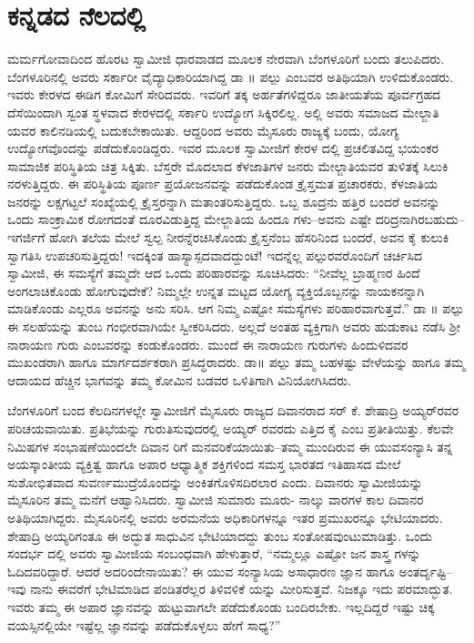 
\chapter{ಕನ್ನಡದ ನೆಲದಲ್ಲಿ}

\noindent

ಮರ್ಮಗೋವಾದಿಂದ ಹೊರಟ ಸ್ವಾಮೀಜಿ ಧಾರವಾಡದ ಮೂಲಕ ನೇರವಾಗಿ ಬೆಂಗಳೂರಿಗೆ ಬಂದು ತಲುಪಿದರು. ಬೆಂಗಳೂರಿನಲ್ಲಿ ಅವರು ಸರ್ಕಾರೀ ವೈದ್ಯಾಧಿಕಾರಿಯಾಗಿದ್ದ ಡಾ ॥ ಪಲ್ಪು ಎಂಬವರ ಅತಿಥಿಯಾಗಿ ಉಳಿದುಕೊಂಡರು. ಇವರು ಕೇರಳದ ಈಡಿಗ ಕೋಮಿಗೆ ಸೇರಿದವರು. ಇವರಿಗೆ ತಕ್ಕ ಅರ್ಹತೆಗಳಿದ್ದರೂ ಜಾತೀಯತೆಯ ಪೂರ್ವಗ್ರಹದ ದೆಸೆಯಿಂದಾಗಿ ಸ್ವಂತ ಸ್ಥಳವಾದ ಕೇರಳದಲ್ಲಿ ಸರ್ಕಾರಿ ಉದ್ಯೋಗ ಸಿಕ್ಕಿರಲಿಲ್ಲ. ಅಲ್ಲಿ ಅವರು ಸಮಾಜದ ಮೇಲ್ಜಾತಿ ಯವರ ಕಾಲಿನಡಿಯಲ್ಲಿ ಬದುಕಬೇಕಾಯಿತು. ಆದ್ದರಿಂದ ಅವರು ಮೈಸೂರು ರಾಜ್ಯಕ್ಕೆ ಬಂದು, ಯೋಗ್ಯ ಉದ್ಯೋಗವೊಂದನ್ನು ಪಡೆದುಕೊಂಡಿದ್ದರು. ಇವರ ಮೂಲಕ ಸ್ವಾಮೀಜಿಗೆ ಕೇರಳ ದಲ್ಲಿ ಪ್ರಚಲಿತವಿದ್ದ ಭಯಂಕರ ಸಾಮಾಜಿಕ ಪರಿಸ್ಥಿತಿಯ ಚಿತ್ರ ಸಿಕ್ಕಿತು. ಬೆಸ್ತರೇ ಮೊದಲಾದ ಕೆಳಜಾತಿಗಳ ಜನರು ಮೇಲ್ಜಾತಿಯವರ ತುಳಿತಕ್ಕೆ ಸಿಲುಕಿ ನರಳುತ್ತಿದ್ದರು. ಈ ಪರಿಸ್ಥಿತಿಯ ಪೂರ್ಣ ಪ್ರಯೋಜನವನ್ನು ಪಡೆದುಕೊಂಡ ಕ್ರೈಸ್ತಮತ ಪ್ರಚಾರಕರು, ಕೆಳಜಾತಿಯ ಜನರನ್ನು ಲಕ್ಷಗಟ್ಟಲೆ ಸಂಖ್ಯೆಯಲ್ಲಿ ಕ್ರೈಸ್ತರನ್ನಾಗಿ ಮತಾಂತರಿಸುತ್ತಿದ್ದರು. ಒಬ್ಬ ಶೂದ್ರನು ಹತ್ತಿರ ಬಂದರೆ ಅವನನ್ನು ಒಂದು ಸಾಂಕ್ರಾಮಿಕ ರೋಗದಂತೆ ದೂರವಿಡುತ್ತಿದ್ದ ಮೇಲ್ಜಾತಿಯ ಹಿಂದೂ ಗಳು–ಅವನು ಎಷ್ಟೇ ದರಿದ್ರನಾಗಿರಬಹುದು–ಇಗರ್ಜಿಗೆ ಹೋಗಿ ತಲೆಯ ಮೇಲೆ ಸ್ವಲ್ಪ ನೀರನ್ನೆರಚಿಸಿಕೊಂಡು ಕ್ರೈಸ್ತನೆಂಬ ಹೆಸರಿನಿಂದ ಬಂದರೆ, ಅವನ ಕೈ ಕುಲುಕಿ ಸ್ವಾಗತಿಸಿ ಉಪಚರಿಸುತ್ತಿದ್ದರು! ಇದಕ್ಕಿಂತ ಹಾಸ್ಯಾಸ್ಪದವಾದದ್ದುಂಟೆ! ಇದನ್ನೆಲ್ಲ ಪಲ್ಪುರವರೊಂದಿಗೆ ಚರ್ಚಿಸಿದ ಸ್ವಾಮೀಜಿ, ಈ ಸಮಸ್ಯೆಗೆ ತಮ್ಮದೇ ಆದ ಒಂದು ಪರಿಹಾರವನ್ನು ಸೂಚಿಸಿದರು: “ನೀವೆಲ್ಲ ಬ್ರಾಹ್ಮಣರ ಹಿಂದೆ ಅಂಗಲಾಚಿಕೊಂಡು ಹೋಗುವುದೇಕೆ? ನಿಮ್ಮಲ್ಲೇ ಉನ್ನತ ಮಟ್ಟದ ಯೋಗ್ಯ ವ್ಯಕ್ತಿಯೊಬ್ಬನನ್ನು ನಾಯಕನನ್ನಾಗಿ ಮಾಡಿಕೊಂಡು ಎಲ್ಲರೂ ಅವನನ್ನು ಅನು ಸರಿಸಿ. ಆಗ ನಿಮ್ಮ ಎಷ್ಟೋ ಸಮಸ್ಯೆಗಳು ಪರಿಹಾರವಾಗುತ್ತವೆ.” ಡಾ ॥ ಪಲ್ಪು ಈ ಸಲಹೆಯನ್ನು ತುಂಬ ಗಂಭೀರವಾಗಿಯೇ ಸ್ವೀಕರಿಸಿದರು. ಅಲ್ಲದೆ ಅಂತಹ ವ್ಯಕ್ತಿಗಾಗಿ ಅವರು ಹುಡುಕಾಟ ನಡೆಸಿ ಶ್ರೀ ನಾರಾಯಣ ಗುರು ಎಂಬವರನ್ನು ಕಂಡುಕೊಂಡರು. ಮುಂದೆ ಈ ನಾರಾಯಣ ಗುರುಗಳು ಹಿಂದುಳಿದವರ ಮುಖಂಡರಾಗಿ ಹಾಗೂ ಮಾರ್ಗದರ್ಶಕರಾಗಿ ಪ್ರಸಿದ್ಧರಾದರು. ಡಾ॥ ಪಲ್ಪು ತಮ್ಮ ಬಹಳಷ್ಟು ವೇಳೆಯನ್ನು ಹಾಗೂ ತಮ್ಮ ಆದಾಯದ ಹೆಚ್ಚಿನ ಭಾಗವನ್ನು ತಮ್ಮ ಕೋಮಿನ ಬಡವರ ಒಳಿತಿಗಾಗಿ ವಿನಿಯೋಗಿಸಿದರು.

ಬೆಂಗಳೂರಿಗೆ ಬಂದ ಕೆಲದಿನಗಳಲ್ಲೇ ಸ್ವಾಮೀಜಿಗೆ ಮೈಸೂರು ರಾಜ್ಯದ ದಿವಾನರಾದ ಸರ್ ಕೆ. ಶೇಷಾದ್ರಿ ಅಯ್ಯರ್​ರವರ ಪರಿಚಯವಾಯಿತು. ಪ್ರತಿಭೆಯನ್ನು ಗುರುತಿಸುವುದರಲ್ಲಿ ಅಯ್ಯರ್ ರವರದು ಎತ್ತಿದ ಕೈ ಎಂಬ ಪ್ರತೀತಿಯಿತ್ತು. ಕೆಲವೇ ನಿಮಿಷಗಳ ಸಂಭಾಷಣೆಯಿಂದಲೇ ದಿವಾನ ರಿಗೆ ಮನವರಿಕೆಯಾಯಿತು–ತಮ್ಮ ಮುಂದಿರುವ ಈ ಯುವಸಂನ್ಯಾಸಿ ತನ್ನ ಅಯಸ್ಕಾಂತೀಯ ವ್ಯಕ್ತಿತ್ವ ಹಾಗೂ ಅಪಾರ ಆಧ್ಯಾತ್ಮಿಕ ಶಕ್ತಿಗಳಿಂದ ಸಮಸ್ತ ಭಾರತದ ಇತಿಹಾಸದ ಮೇಲೆ ಸುಶೋಭಿತವಾದ ಸುವರ್ಣಮುದ್ರೆಯೊಂದನ್ನು ಅಂಕಿತಗೊಳಿಸದಿರಲಾರ ಎಂದು. ದಿವಾನರು ಸ್ವಾಮೀಜಿಯನ್ನು ಮೈಸೂರಿನ ತಮ್ಮ ಮನೆಗೆ ಆಹ್ವಾನಿಸಿದರು. ಸ್ವಾಮೀಜಿ ಸುಮಾರು ಮೂರು- ನಾಲ್ಕು ವಾರಗಳ ಕಾಲ ದಿವಾನರ ಅತಿಥಿಯಾಗಿದ್ದರು. ಮೈಸೂರಿನಲ್ಲಿ ಅವರು ಅರಮನೆಯ ಅಧಿಕಾರಿಗಳನ್ನೂ ಇತರ ಪ್ರಮುಖರನ್ನೂ ಭೇಟಿಯಾದರು. ಶೇಷಾದ್ರಿ ಅಯ್ಯರಿಗಂತೂ ಈ ಅದ್ಭುತ ಸಾಧುವಿನ ಭೇಟಿಯಾದದ್ದು ತುಂಬ ಸಂತೋಷವುಂಟುಮಾಡಿತ್ತು. ಒಂದು ಸಂದರ್ಭ ದಲ್ಲಿ ಅವರು ಸ್ವಾಮೀಜಿಯ ಸಂಬಂಧವಾಗಿ ಹೇಳುತ್ತಾರೆ, “ನಮ್ಮಲ್ಲೂ ಎಷ್ಟೋ ಜನ ಶಾಸ್ತ್ರ ಗಳನ್ನು ಓದಿದವರಿದ್ದಾರೆ. ಆದರೆ ಅದರಿಂದೇನಾಯಿತು? ಈ ಯುವ ಸಂನ್ಯಾಸಿಯ ಅಸಾಧಾರಣ ಜ್ಞಾನ ಹಾಗೂ ಅಂತರ್ದೃಷ್ಟಿ–ಇವು ನಾನು ಈವರೆಗೆ ಭೇಟಿಮಾಡಿದ ಪಂಡಿತರೆಲ್ಲರ ತಿಳಿವಳಿಕೆ ಯನ್ನು ಮೀರಿಸುತ್ತವೆ. ನಿಜಕ್ಕೂ ಇದು ಪರಮಾದ್ಭುತ. ಇವರು ತಮ್ಮ ಈ ಅಪಾರ ಜ್ಞಾನವನ್ನು ಹುಟ್ಟುವಾಗಲೇ ಪಡೆದುಕೊಂಡು ಬಂದಿರಬೇಕು. ಇಲ್ಲದಿದ್ದರೆ ಇಷ್ಟು ಚಿಕ್ಕ ವಯಸ್ಸಿನಲ್ಲಿಯೇ ಇಷ್ಟೆಲ್ಲ ಜ್ಞಾನವನ್ನು ಪಡೆದುಕೊಳ್ಳಲು ಹೇಗೆ ಸಾಧ್ಯ?”

